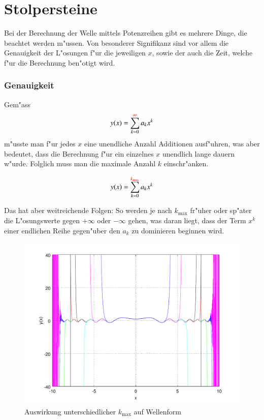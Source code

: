 \section{Stolpersteine}

Bei der Berechnung der Welle mittels Potenzreihen gibt es mehrere Dinge, die 
beachtet werden m"ussen. Von besonderer Signifikanz sind vor allem die 
Genauigkeit der L"osungen f"ur die jeweiligen $x$, sowie der auch die Zeit, 
welche f"ur die Berechnung ben"otigt wird.


\subsubsection{Genauigkeit}
Gem"ass
\begin{equation*}
	y(x) = \sum_{k=0}^{\textcolor{red}{\infty}}a_kx^k
\end{equation*}
m"usste man f"ur jedes $x$ eine unendliche Anzahl Additionen ausf"uhren, was 
aber bedeutet, dass die Berechnung f"ur ein einzelnes $x$ unendlich lange 
dauern w"urde. Folglich muss man die maximale Anzahl $k$ einschr"anken.

\begin{equation*}
	y(x) = \sum_{k=0}^{\textcolor{red}{k_{\text{max}}}}a_kx^k
\end{equation*}

Das hat aber weitreichende Folgen: So werden je nach $k_{\text{max}}$ fr"uher 
oder sp"ater die L"osungswerte gegen $+\infty$ oder $-\infty$ gehen, was daran 
liegt, dass der Term $x^k$ einer endlichen Reihe gegen"uber den $a_k$ zu 
dominieren beginnen wird.

\begin{figure}
	\includegraphics[scale=0.65]{./wellen/images/kmax/kmax.pdf}
	\caption{Auswirkung unterschiedlicher $k_{\text{max}}$ auf Wellenform}
	\label{fig:wellen:variablekmax}
\end{figure}

